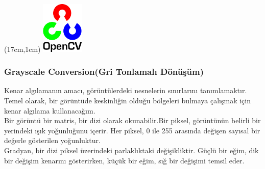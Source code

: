 \documentclass{article}
\begin{document}
\begin{textblock*}{5cm}(17cm,1cm) %
    \includegraphics[width=2cm]{image/Resim17.png} %
\end{textblock*}


\subsubsection{Grayscale Conversion(Gri Tonlamalı Dönüşüm)}
Kenar algılamanın amacı, görüntülerdeki nesnelerin sınırlarını tanımlamaktır. Temel olarak, bir görüntüde keskinliğin olduğu bölgeleri bulmaya çalışmak için kenar algılama kullanacağım.\\[1pt]

\noindent Bir görüntü bir matris, bir dizi olarak okunabilir.Bir piksel, görüntünün belirli bir yerindeki ışık yoğunluğunu içerir. Her piksel, 0 ile 255 arasında değişen sayısal bir değerle gösterilen yoğunluktur.\\[1pt]


\noindent Gradyan, bir dizi piksel üzerindeki parlaklıktaki değişikliktir.
Güçlü bir eğim, dik bir değişim kenarını gösterirken, küçük bir eğim, sığ bir değişimi temsil eder.
\end{document}
